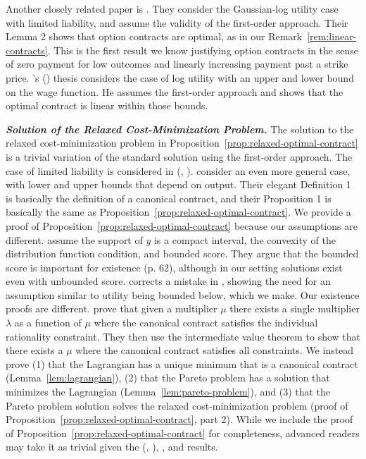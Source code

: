 Another closely related paper is \textcite{chaigneau2022should}. They consider the Gaussian-log utility case with limited liability, and assume the validity of the first-order approach. Their Lemma 2 shows that option contracts are optimal, as in our Remark~\ref{rem:linear-contracts}. This is the first result we know justifying option contracts in the sense of zero payment for low outcomes and linearly increasing payment past a strike price. \citeauthor{holmstrom1978incentives}'s (\citeyear{holmstrom1978incentives}) thesis considers the case of log utility with an upper and lower bound on the wage function. He assumes the first-order approach and shows that the optimal contract is linear within those bounds.


\medskip\noindent\textit{\textbf{Solution of the Relaxed Cost-Minimization Problem.}}
The solution to the relaxed cost-minimization problem in Proposition~\ref{prop:relaxed-optimal-contract} is a trivial variation of the standard solution using the first-order approach. The case of limited liability is considered in \citeauthor{holmstrom1978incentives} (\citeyear{holmstrom1978incentives}, \citeyear{holmstrom1979moral}). \textcite{jewitt2008moral} consider an even more general case, with lower and upper bounds that depend on output. Their elegant Definition 1 is basically the definition of a canonical contract, and their Proposition 1 is basically the same as Proposition~\ref{prop:relaxed-optimal-contract}. We provide a proof of Proposition~\ref{prop:relaxed-optimal-contract} because our assumptions are different. \textcite{jewitt2008moral} assume the support of $y$ is a compact interval, the convexity of the distribution function condition, and bounded score. They argue that the bounded score is important for existence (p. 62), although in our setting solutions exist even with unbounded score. \textcite{moroni2014existence} corrects a mistake in \textcite{jewitt2008moral}, showing the need for an assumption similar to utility being bounded below, which we make. Our existence proofs are different. \textcite{jewitt2008moral} prove that given a multiplier $\mu$ there exists a single multiplier $\lambda$ as a function of $\mu$ where the canonical contract satisfies the individual rationality constraint. They then use the intermediate value theorem to show that there exists a $\mu$ where the canonical contract satisfies all constraints. We instead prove (1) that the Lagrangian has a unique minimum that is a canonical contract (Lemma~\ref{lem:lagrangian}), (2) that the Pareto problem has a solution that minimizes the Lagrangian (Lemma~\ref{lem:pareto-problem}), and (3) that the Pareto problem solution solves the relaxed cost-minimization problem (proof of Proposition~\ref{prop:relaxed-optimal-contract}, part 2). While we include the proof of Proposition~\ref{prop:relaxed-optimal-contract} for completeness, advanced readers may take it as trivial given the \citeauthor{holmstrom1978incentives} (\citeyear{holmstrom1978incentives}, \citeyear{holmstrom1979moral}), \textcite{jewitt2008moral}, and \textcite{moroni2014existence} results.


